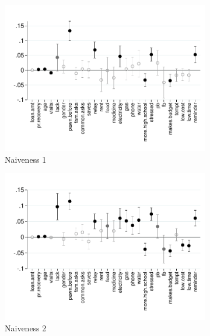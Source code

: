\documentclass[11pt]{article}
\begin{document}
\begin{figure}[H]
    \caption{Determinants of naiveness}
    \label{det_naiveness}
    \begin{center}
    \begin{subfigure}{0.45\textwidth}
        \caption{Naiveness 1}
        \centering
        \includegraphics[width=\textwidth]{Figuras/det_naiveness_ref_c.pdf}
    \end{subfigure}
    \begin{subfigure}{0.45\textwidth}
        \caption{Naiveness 2}
        \centering
        \includegraphics[width=\textwidth]{Figuras/det_naiveness_ref_default.pdf}
    \end{subfigure}
        \begin{subfigure}{0.45\textwidth}

\end{subfigure}
\end{center}
\end{figure}
\end{document}
